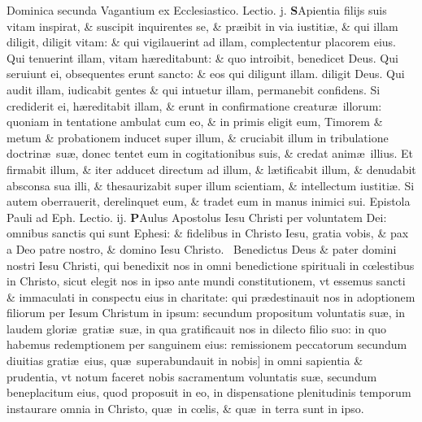 \documentclass[a5paper,10pt]{book}
\def\leftmarginnote{%
	\lrmarginnote{\hskip -\marginparsep \hskip -6.5em}}
\def\rightmarginnote{%
	\lrmarginnote{\hskip\columnwidth \hskip -1em}}
\def\ae{æ}
\def\oe{œ}
\begin{document}
\begin{multicols*}{2}
\newline {} \color{red} \hypertarget{SUN-SECVNDA-VAGAN}{Dominica} secunda Vagantium ex Ecclesiastico. \quad Lectio. j. \color{black}
\vspace{-.25em}
\lettrine[lines=2]{\bfseries S}{}Apientia\rightmarginnote{ca. 4.} filijs suis vitam inspirat, \& suscipit inquirentes se, \& pr\ae ibit in via iustiti\ae , \& qui illam diligit, diligit vitam: \& qui vigilauerint ad illam, complectentur placorem eius.
Qui tenuerint illam, vitam h\ae reditabunt: \& quo introibit, benedicet Deus. Qui seruiunt ei, obsequentes erunt sancto: \& eos qui diligunt illam. diligit Deus.
Qui audit illam, iudicabit gentes \& qui intuetur illam, permanebit confidens. Si crediderit ei, h\ae reditabit illam, \& erunt in confirmatione creatur\ae \ illorum: quoniam in tentatione ambulat cum eo, \& in primis eligit eum, Timorem \& metum \& probationem inducet super illum, \& cruciabit illum in tribulatione doctrin\ae \ su\ae , donec tentet eum in cogitationibus suis, \& credat anim\ae \ illius.
Et firmabit illum, \& iter adducet directum ad illum, \& l\ae tificabit illum, \& denudabit absconsa sua illi, \& thesaurizabit super illum scientiam, \& intellectum iustiti\ae .
Si autem oberrauerit, derelinquet eum, \& tradet eum in manus inimici sui.
\newline {} \color{red} Epistola Pauli ad Eph. \hfill Lectio. ij. \color{black}
\vspace{-.25em}
\lettrine[lines=2]{\bfseries \color{red} P}{}Aulus\rightmarginnote{ca. 1.} Apostolus Iesu Christi per voluntatem Dei: omnibus sanctis qui sunt Ephesi: \& fidelibus in Christo Iesu, gratia vobis, \& pax a Deo patre nostro, \& domino Iesu Christo. \textdagger \ 
Benedictus\rightmarginnote{A} Deus \& pater domini nostri Iesu Christi, qui benedixit nos in omni benedictione spirituali in c\oe lestibus in Christo, sicut elegit nos in ipso ante mundi constitutionem, vt essemus sancti \& immaculati in conspectu eius in charitate: qui pr\ae destinauit nos in adoptionem filiorum per Iesum Christum in ipsum: secundum propositum voluntatis su\ae , in laudem glori\ae \ grati\ae \ su\ae , in qua gratificauit nos in dilecto filio suo: in quo habemus redemptionem per sanguinem eius: remissionem peccatorum secundum diuitias grati\ae \ eius, qu\ae \ superabundauit in nobis]
in\leftmarginnote{\begin{flushright}B\end{flushright}} omni sapientia \& prudentia, vt notum faceret nobis sacramentum voluntatis su\ae , secundum beneplacitum eius, quod proposuit in eo, in dispensatione plenitudinis temporum instaurare omnia in Christo, qu\ae \ in c\oe lis, \& qu\ae \ in terra sunt in ipso.

\end{multicols*}
\end{document}
